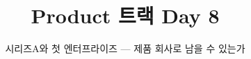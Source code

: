 \documentclass[aspectratio=169,11pt,t]{beamer}
\title{Product 트랙 Day 8}
\subtitle{시리즈A와 첫 엔터프라이즈 — 제품 회사로 남을 수 있는가}
\begin{document}
\begin{frame}[plain,c]
\titlepage
\end{frame}

\end{document}

